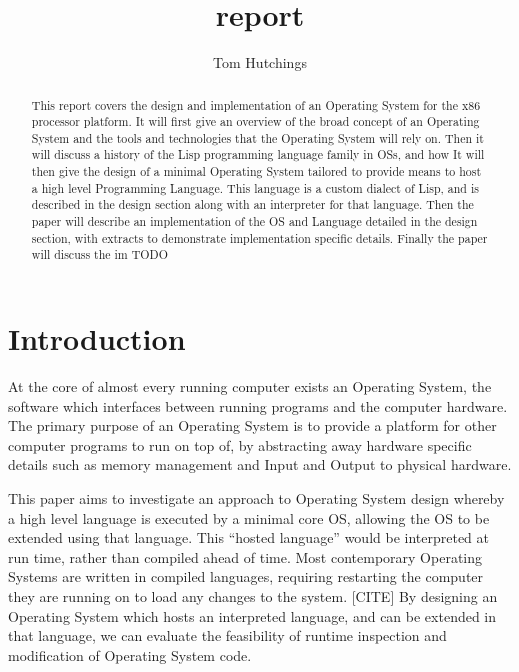 \documentclass[11pt]{report}
\begin{document}
\title{report}
\author{Tom Hutchings}

\maketitle

\begin{abstract}
  This report covers the design and implementation of an Operating System for the x86 processor platform. It will first give an overview of the broad concept of an Operating System and the tools and technologies that the Operating System will rely on. Then it will discuss a history of the Lisp programming language family in OSs, and how  It will then give the design of a minimal Operating System tailored to provide means to host a high level Programming Language. This language is a custom dialect of Lisp, and is described in the design section along with an interpreter for that language.
  Then the paper will describe an implementation of the OS and Language detailed in the design section, with extracts to demonstrate implementation specific details. Finally the paper will discuss the im TODO
  
\end{abstract}

\tableofcontents
\newpage

\chapter{Introduction}
At the core of almost every running computer exists an Operating System, the software which interfaces between running programs and the computer hardware. The primary purpose of an Operating System is to provide a platform for other computer programs to run on top of, by abstracting away hardware specific details such as memory management and Input and Output to physical hardware.

This paper aims to investigate an approach to Operating System design whereby a high level language is executed by a minimal core OS, allowing the OS to be extended using that language. This ``hosted language'' would be interpreted at run time, rather than compiled ahead of time. Most contemporary Operating Systems are written in compiled languages, requiring restarting the computer they are running on to load any changes to the system. [CITE] By designing an Operating System which hosts an interpreted language, and can be extended in that language, we can evaluate the feasibility of runtime inspection and modification of Operating System code.
\end{document}
